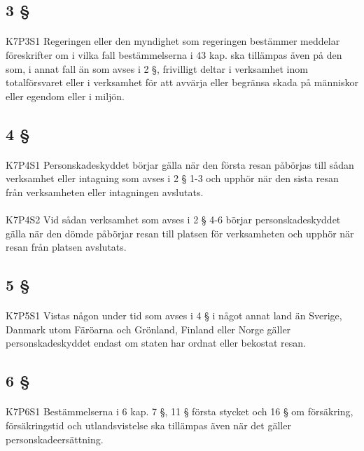 \documentclass[a4paper,notitlepage,openany,10pt]{book}
\begin{document}
\subsection*{3 §}
\paragraph*{}
{\tiny K7P3S1}
Regeringen eller den myndighet som regeringen bestämmer meddelar föreskrifter om i vilka fall bestämmelserna i 43 kap. ska tillämpas även på den som, i annat fall än som avses i 2 §, frivilligt deltar i verksamhet inom totalförsvaret eller i verksamhet för att avvärja eller begränsa skada på människor eller egendom eller i miljön.
\subsection*{4 §}
\paragraph*{}
{\tiny K7P4S1}
Personskadeskyddet börjar gälla när den första resan påbörjas till sådan verksamhet eller intagning som avses i 2 § 1-3 och upphör när den sista resan från verksamheten eller intagningen avslutats.
\paragraph*{}
{\tiny K7P4S2}
Vid sådan verksamhet som avses i 2 § 4-6 börjar personskadeskyddet gälla när den dömde påbörjar resan till platsen för verksamheten och upphör när resan från platsen avslutats.
\subsection*{5 §}
\paragraph*{}
{\tiny K7P5S1}
Vistas någon under tid som avses i 4 § i något annat land än Sverige, Danmark utom Färöarna och Grönland, Finland eller Norge gäller personskadeskyddet endast om staten har ordnat eller bekostat resan.
\subsection*{6 §}
\paragraph*{}
{\tiny K7P6S1}
Bestämmelserna i 6 kap. 7 §, 11 § första stycket och 16 § om försäkring, försäkringstid och utlandsvistelse ska tillämpas även när det gäller personskadeersättning.
\end{document}
